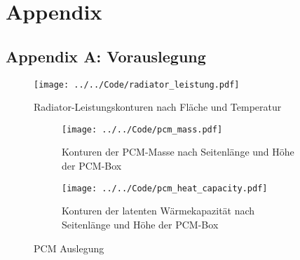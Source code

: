 \chapter*{Appendix}
\label{chapter:Appendix}
\pagestyle{Appendix}

\section*{Appendix A: Vorauslegung}\label{Anh:programmcode}

\begin{figure}[H]
  \centering
  \texttt{[image: ../../Code/radiator\_leistung.pdf]}
  \caption{Radiator-Leistungskonturen nach Fläche und Temperatur}\label{fig:radiator_flaeche_leistung}
\end{figure}

\begin{figure}[H]
    \centering
    \begin{subfigure}{0.9\textwidth}
        \centering
        \texttt{[image: ../../Code/pcm\_mass.pdf]}
        \caption{Konturen der PCM-Masse nach Seitenlänge und Höhe der PCM-Box}\label{fig:pcm_mass}
    \end{subfigure}
    \vspace{1em}
    \begin{subfigure}{0.9\textwidth}
        \centering
        \texttt{[image: ../../Code/pcm\_heat\_capacity.pdf]}
        \caption{Konturen der latenten Wärmekapazität nach Seitenlänge und Höhe der PCM-Box}\label{fig:pcm_heat}
    \end{subfigure}
    \caption{PCM Auslegung}\label{fig:pcm_mass_heat}
\end{figure}

\newpage


